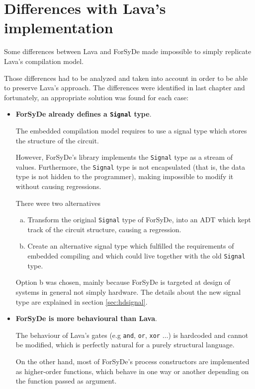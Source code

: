 \section{Differences with Lava's implementation}

Some differences between Lava and ForSyDe made impossible to simply
replicate Lava's compilation model.

Those differences had to be analyzed and taken into account in order to
be able to preserve Lava's approach. The differences were identified in
last chapter and fortunately, an appropriate solution was found for
each case:
 
\begin{itemize}
\item \textbf{ForSyDe already defines a \texttt{Signal} type}.

  The embedded compilation model requires to use a signal type which stores
  the structure of the circuit.  

  However, ForSyDe's library implements the \texttt{Signal} type as a
  stream of values.  Furthermore, the \texttt{Signal} type is not
  encapsulated (that is, the data type is not hidden to the
  programmer), making impossible to modify it without causing
  regressions.

  There were two alternatives 

  \begin{enumerate}[a)]
  \item Transform the original \texttt{Signal} type of ForSyDe, into
    an ADT which kept track of the circuit structure, causing a
    regression.  
  \item Create an alternative signal type which fulfilled the
    requirements of embedded compiling and which could live together
    with the old \texttt{Signal} type.
  \end{enumerate}

  Option b was chosen, mainly because ForSyDe is targeted at design of
  systems in general not simply hardware. The details about the new
  signal type are explained in section \ref{sec:hdsignal}.

\item \textbf{ForSyDe is more behavioural than Lava}.

  The behaviour of Lava's gates (e.g \texttt{and}, \texttt{or},
  \texttt{xor} $\dots$) is hardcoded and cannot be modified, which is
  perfectly natural for a purely structural language.

  On the other hand, most of ForSyDe's process constructors are
  implemented as higher-order functions, which behave in one way or
  another depending on the function passed as argument.
  

\end{itemize}
